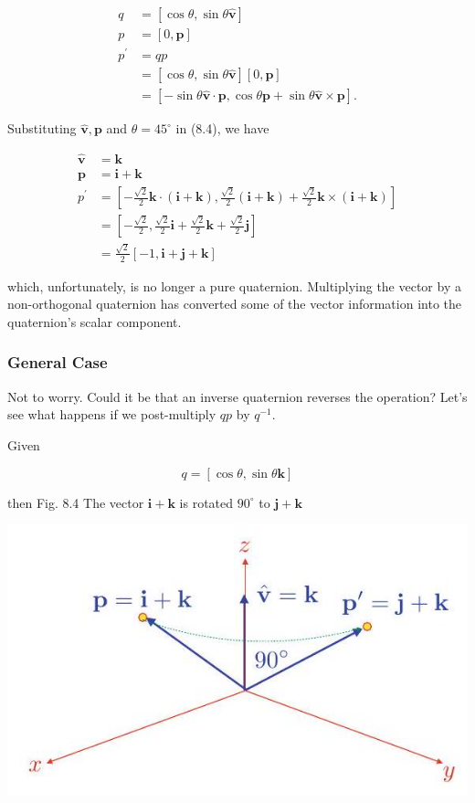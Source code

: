 \documentclass[10pt]{article}
\begin{document}
$$
\begin{aligned}
q & =[\cos \theta, \sin \theta \hat{\mathbf{v}}] \\
p & =[0, \mathbf{p}] \\
p^{\prime} & =q p \\
& =[\cos \theta, \sin \theta \hat{\mathbf{v}}][0, \mathbf{p}] \\
& =[-\sin \theta \hat{\mathbf{v}} \cdot \mathbf{p}, \cos \theta \mathbf{p}+\sin \theta \hat{\mathbf{v}} \times \mathbf{p}] .
\end{aligned}
$$

Substituting $\hat{\mathbf{v}}, \mathbf{p}$ and $\theta=45^{\circ}$ in (8.4), we have

$$
\begin{aligned}
\hat{\mathbf{v}} & =\mathbf{k} \\
\mathbf{p} & =\mathbf{i}+\mathbf{k} \\
p^{\prime} & =\left[-\frac{\sqrt{2}}{2} \mathbf{k} \cdot(\mathbf{i}+\mathbf{k}), \frac{\sqrt{2}}{2}(\mathbf{i}+\mathbf{k})+\frac{\sqrt{2}}{2} \mathbf{k} \times(\mathbf{i}+\mathbf{k})\right] \\
& =\left[-\frac{\sqrt{2}}{2}, \frac{\sqrt{2}}{2} \mathbf{i}+\frac{\sqrt{2}}{2} \mathbf{k}+\frac{\sqrt{2}}{2} \mathbf{j}\right] \\
& =\frac{\sqrt{2}}{2}[-1, \mathbf{i}+\mathbf{j}+\mathbf{k}]
\end{aligned}
$$

which, unfortunately, is no longer a pure quaternion. Multiplying the vector by a non-orthogonal quaternion has converted some of the vector information into the quaternion's scalar component.

\subsubsection{General Case}
Not to worry. Could it be that an inverse quaternion reverses the operation? Let's see what happens if we post-multiply $q p$ by $q^{-1}$.

Given

$$
q=[\cos \theta, \sin \theta \mathbf{k}]
$$

then Fig. 8.4 The vector $\mathbf{i}+\mathbf{k}$ is rotated $90^{\circ}$ to $\mathbf{j}+\mathbf{k}$

\begin{center}
\includegraphics[max width=\textwidth]{2023_04_20_41f1ceac5a31dc7d1b59g-145}
\end{center}
\end{document}
